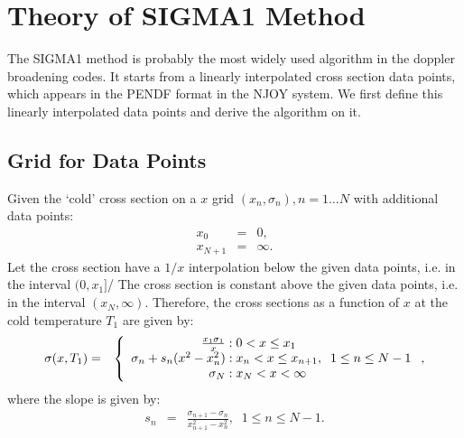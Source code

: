 \section{Theory of SIGMA1 Method}
The SIGMA1 method is probably the most widely used algorithm in the doppler broadening codes. It starts from a linearly interpolated cross section data points, which appears in the PENDF format in the NJOY system. We first define this linearly interpolated data points and derive the algorithm on it.
\subsection{Grid for Data Points}
Given the `cold'  cross section on a $x$ grid $(x_n,\sigma_n),n=1\dots N$ with additional data points:
\begin{eqnarray}
x_0 &=& 0,\\
x_{N+1} &=& \infty.
\end{eqnarray}
Let the cross section have a $1/x$ interpolation below the given data points, i.e. in the interval $(0,x_1]$/ The cross section is constant above the given data points, i.e. in the interval $(x_N,\infty)$. Therefore, the cross sections as a function of $x$ at the cold temperature $T_1$ are given by:
\begin{eqnarray}
\sigma(x,T_1)&=&\left\{
\begin{array}{r @{\;:\;} l}
\frac{x_1\sigma_1}{x} & 0<x\leq x_1\\
\sigma_n+s_n(x^2-x_n^2) & x_n<x\leq x_{n+1},\;\;1\leq n\leq {N-1}\\
\sigma_N & x_N<x<\infty
\end{array}\right.,
\label{eq:dbxsec}
\end{eqnarray}
where the slope is given by:
\begin{eqnarray}
s_n &=& \frac{\sigma_{n+1}-\sigma_n}{x_{n+1}^2-x_n^2},\;\;1\leq n\leq {N-1}.
\end{eqnarray}
